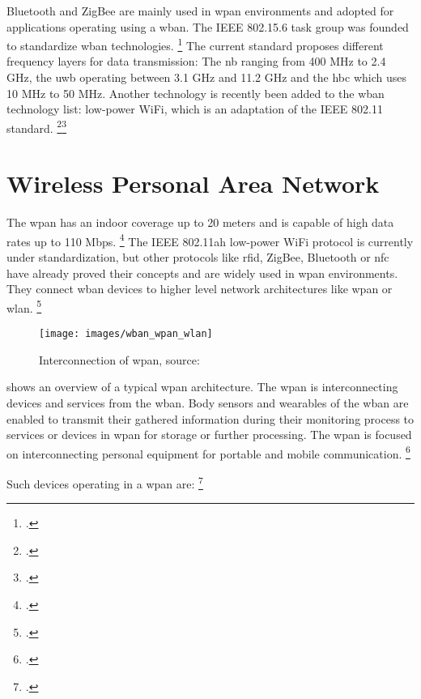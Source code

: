 Bluetooth and ZigBee are mainly used in \gls{wpan} environments and adopted for applications operating using a \gls{wban}. The IEEE 802.15.6 task group was founded to standardize \gls{wban} technologies. \footcite[Cf.][10]{Latre2011} The current standard proposes different frequency layers for data transmission: The \gls{nb} ranging from 400 MHz to 2.4 GHz, the \gls{uwb} operating between 3.1 GHz and 11.2 GHz and the \gls{hbc} which uses 10 MHz to 50 MHz. Another technology is recently been added to the \gls{wban} technology list: low-power WiFi, which is an adaptation of the IEEE 802.11 standard. \footcite[Cf.][]{Kwak2010}\footcite[Cf.][180--187]{Minoli2013}

\section{Wireless Personal Area Network}

The \gls{wpan} has an indoor coverage up to 20 meters and is capable of high data rates up to 110 Mbps. \footcite[Cf.][676]{Garg2007} The IEEE 802.11ah low-power WiFi protocol is currently under standardization, but other protocols like \gls{rfid}, ZigBee, Bluetooth or \gls{nfc} have already proved their concepts and are widely used in \gls{wpan} environments. They connect \gls{wban} devices to higher level network architectures like \gls{wpan} or \gls{wlan}. \footcite[Cf.][]{wban_wpan_wlan}

\begin{figure}[ht]
  \centering
  \texttt{[image: images/wban\_wpan\_wlan]}
  \caption{Interconnection of \gls{wpan}, source: \cite{wban_wpan_wlan}}
  \label{fig:wban_wpan_wlan}
\end{figure}

 shows an overview of a typical \gls{wpan} architecture. The \gls{wpan} is interconnecting devices and services from the \gls{wban}. Body sensors and wearables of the \gls{wban} are enabled to transmit their gathered information during their monitoring process to services or devices in \gls{wpan} for storage or further processing. The \gls{wpan} is focused on interconnecting personal equipment for portable and mobile communication. \footcite[Cf.][654-704]{Garg2007}

Such devices operating in a \gls{wpan} are: \footcite[Cf.][654-704]{Garg2007}

